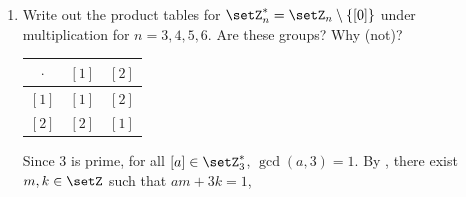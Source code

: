 \begin{enumerate}
\begin{subprove}
    \begin{center}
    \begin{tabular}{|c|c|c|c|c|c|c|}
    \hline
    \(+\) & \([0]\) & \([1]\) & \([2]\) & \([3]\) & \([4]\) & \([5]\) \\
    \hline
    \([0]\) & \([0]\) & \([1]\) & \([2]\) & \([3]\) & \([4]\) & \([5]\) \\
    \hline
    \([1]\) & \([1]\) & \([2]\) & \([3]\) & \([4]\) & \([5]\) & \([0]\) \\
    \hline
    \([2]\) & \([2]\) & \([3]\) & \([4]\) & \([5]\) & \([0]\) & \([1]\) \\
    \hline
    \([3]\) & \([3]\) & \([4]\) & \([5]\) & \([0]\) & \([1]\) & \([2]\) \\
    \hline
    \([4]\) & \([4]\) & \([5]\) & \([0]\) & \([1]\) & \([2]\) & \([3]\) \\
    \hline
    \([5]\) & \([5]\) & \([0]\) & \([1]\) & \([2]\) & \([3]\) & \([4]\) \\
    \hline
    \end{tabular}
    \end{center}
    s: \(\{[0]\}\), \(\{[0], [3]\}\), \(\{[0], [2], [4]\}\), \(\setZ_{6}\).
  \end{subprove}
  \newpage
  \begin{define}{Bézout's Identity}[thm:bezout-identity][red]
    For \(a, b \in \setZ\) with either \(a \neq 0\) or \(b \neq 0\), 
    the greatest common divisor of \(a\) and \(b\) is \(1\) if and only if 
    there exist \(m, n \in \setZ\) such that
    \[
      a m + b n = 1.
    \]
  \end{define}
  \item Write out the product tables for \(\setZ_{n}^{*} = \setZ_{n} \setminus \{[0]\}\) 
  under multiplication for \(n = 3, 4, 5, 6\).
  Are these groups? Why (not)?
  \begin{subprove}
    \begin{center}
    \begin{tabular}{|c|c|c|}
    \hline
    \(\cdot\) & \([1]\) & \([2]\) \\
    \hline
    \([1]\) & \([1]\) & \([2]\) \\
    \hline
    \([2]\) & \([2]\) & \([1]\) \\
    \hline
    \end{tabular}
    \end{center}
    Since \(3\) is prime, for all \([a] \in \setZ_{3}^{*}\), 
    \(\gcd(a, 3) = 1\). By , 
    there exist \(m, k \in \setZ\) such that \(a m + 3 k = 1\), 

\end{subprove}
\end{enumerate}
